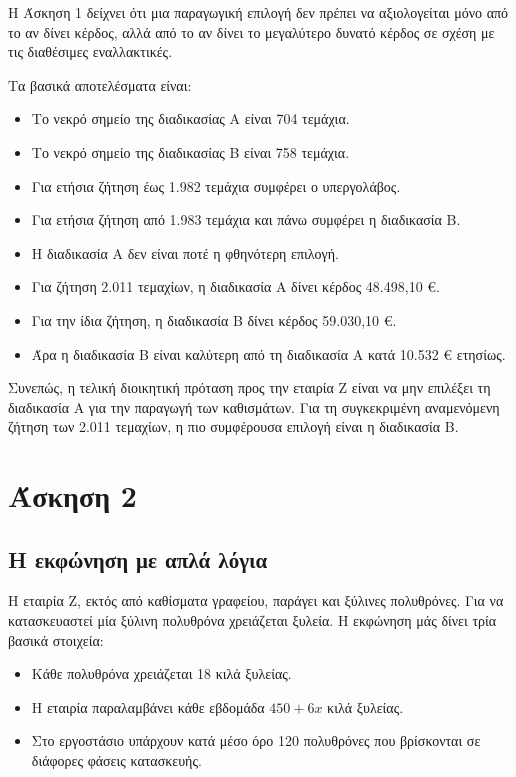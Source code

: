 \documentclass[12pt,a4paper]{article}
\begin{document}
Η Άσκηση 1 δείχνει ότι μια παραγωγική επιλογή δεν πρέπει να αξιολογείται μόνο από το αν δίνει κέρδος, αλλά από το αν δίνει το μεγαλύτερο δυνατό κέρδος σε σχέση με τις διαθέσιμες εναλλακτικές.

Τα βασικά αποτελέσματα είναι:

\begin{itemize}
    \item Το νεκρό σημείο της διαδικασίας Α είναι 704 τεμάχια.
    \item Το νεκρό σημείο της διαδικασίας Β είναι 758 τεμάχια.
    \item Για ετήσια ζήτηση έως 1.982 τεμάχια συμφέρει ο υπεργολάβος.
    \item Για ετήσια ζήτηση από 1.983 τεμάχια και πάνω συμφέρει η διαδικασία Β.
    \item Η διαδικασία Α δεν είναι ποτέ η φθηνότερη επιλογή.
    \item Για ζήτηση 2.011 τεμαχίων, η διαδικασία Α δίνει κέρδος 48.498,10 €.
    \item Για την ίδια ζήτηση, η διαδικασία Β δίνει κέρδος 59.030,10 €.
    \item Άρα η διαδικασία Β είναι καλύτερη από τη διαδικασία Α κατά 10.532 € ετησίως.
\end{itemize}

Συνεπώς, η τελική διοικητική πρόταση προς την εταιρία Ζ είναι να μην επιλέξει τη διαδικασία Α για την παραγωγή των καθισμάτων. Για τη συγκεκριμένη αναμενόμενη ζήτηση των 2.011 τεμαχίων, η πιο συμφέρουσα επιλογή είναι η διαδικασία Β.

\newpage

\section{Άσκηση 2}

\subsection{Η εκφώνηση με απλά λόγια}

Η εταιρία Ζ, εκτός από καθίσματα γραφείου, παράγει και ξύλινες πολυθρόνες. Για να κατασκευαστεί μία ξύλινη πολυθρόνα χρειάζεται ξυλεία. Η εκφώνηση μάς δίνει τρία βασικά στοιχεία:

\begin{itemize}
    \item Κάθε πολυθρόνα χρειάζεται 18 κιλά ξυλείας.
    \item Η εταιρία παραλαμβάνει κάθε εβδομάδα \(450+6x\) κιλά ξυλείας.
    \item Στο εργοστάσιο υπάρχουν κατά μέσο όρο 120 πολυθρόνες που βρίσκονται σε διάφορες φάσεις κατασκευής.
\end{itemize}
\end{document}
